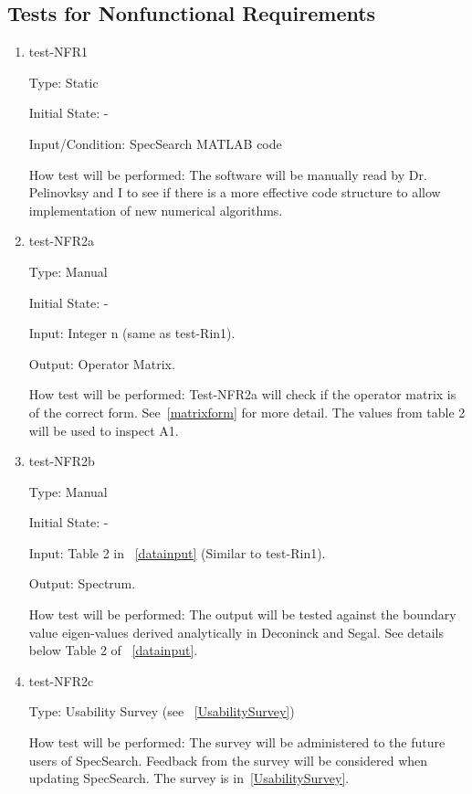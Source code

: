 \documentclass[12pt, titlepage]{article}
\begin{document}
\subsection{Tests for Nonfunctional Requirements}
\label{NFRtests}
\begin{enumerate}

\item{test-NFR1\\}

Type: Static
					
Initial State: -
					
Input/Condition: SpecSearch MATLAB code
					
How test will be performed: The software will be manually read by Dr. 
Pelinovksy  and I to see if there is a more effective code structure to allow 
implementation of new numerical algorithms.  

\item{test-NFR2a\\} 

Type: Manual 

Initial State: -

Input: Integer n (same as test-Rin1).

Output: Operator Matrix.

How test will be performed: Test-NFR2a will check if the operator matrix is of 
the correct form. See~\ref{matrixform} for more detail. The values from table 
2 
will be used to inspect A1.   \\

\item{test-NFR2b\\} 

Type: Manual 

Initial State: -

Input: Table 2 in ~\ref{datainput} (Similar to test-Rin1). 

Output: Spectrum.

How test will be performed: The output will be tested against the boundary 
value eigen-values derived analytically in Deconinck and Segal. See details 
below Table 2 of ~\ref{datainput}.\\ 

\item{test-NFR2c\\} 

Type: Usability Survey (see ~\ref{UsabilitySurvey}) 

How test will be performed: The survey will be administered to the future users 
of SpecSearch. Feedback from the survey will be considered when updating 
SpecSearch. The survey is in~\ref{UsabilitySurvey}. 

\end{enumerate}
\end{document}
